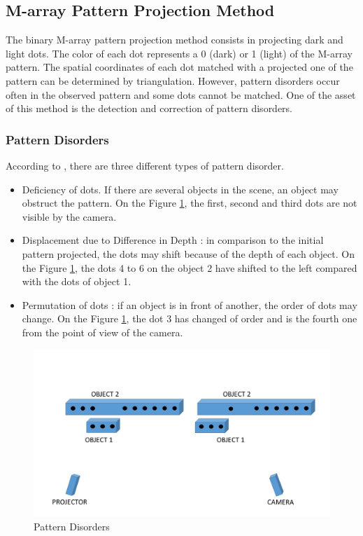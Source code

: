 \subsection{M-array Pattern Projection Method \cite{morita1988reconstruction}}

The binary M-array pattern projection method consists in projecting dark and light dots. The color of each dot represents a 0 (dark) or 1 (light) of the M-array pattern. The spatial coordinates of each dot matched with a projected one of the pattern can be determined by triangulation. However, pattern disorders occur often in the observed pattern and some dots cannot be matched. One of the asset of this method is the detection and correction of pattern disorders.

\subsubsection{Pattern Disorders}
\label{PatternDisorders}
According to \cite{morita1988reconstruction}, there are three different types of pattern disorder.
\begin{itemize}
\item Deficiency of dots. If there are several objects in the scene, an object may obstruct the pattern. On the Figure \ref{fig:disorder1}, the first, second and third dots are not visible by the camera.
\item Displacement due to Difference in Depth : in comparison to the initial pattern projected, the dots may shift because of the depth of each object. On the Figure \ref{fig:disorder1}, the dots 4 to 6 on the object 2 have shifted to the left compared with the dots of object 1.
\item Permutation of dots : if an object is in front of another, the order of dots may change. On the Figure \ref{fig:disorder1}, the dot 3 has changed of order and is the fourth one from the point of view of the camera.
\end{itemize}

\begin{figure}[h]
  \centerline{\includegraphics[scale=0.6]{fig/disorder1.jpg}}
  \caption{Pattern Disorders}
  \label{fig:disorder1}
\end{figure}






